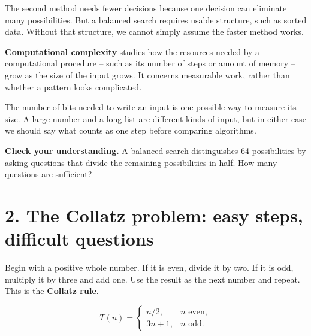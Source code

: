 \documentclass[11pt,letterpaper]{article}
\begin{document}
\par{}\par\medskip


The second method needs fewer decisions because one decision can eliminate many possibilities. But a balanced search requires usable structure, such as sorted data. Without that structure, we cannot simply assume the faster method works.


\textbf{Computational complexity} studies how the resources needed by a computational procedure -- such as its number of steps or amount of memory -- grow as the size of the input grows. It concerns measurable work, rather than whether a pattern looks complicated.

The number of bits needed to write an input is one possible way to measure its size. A large number and a long list are different kinds of input, but in either case we should say what counts as one step before comparing algorithms.



\begin{tcolorbox}[title={Pause and try 1},breakable]
\textbf{Check your understanding.} A balanced search distinguishes 64 possibilities by asking questions that divide the remaining possibilities in half. How many questions are sufficient?
\end{tcolorbox}




\section{2. The Collatz problem: easy steps, difficult questions}


Begin with a positive whole number. If it is even, divide it by two. If it is odd, multiply it by three and add one. Use the result as the next number and repeat. This is the \textbf{Collatz rule}.


\[
T(n)=\begin{cases} n/2,&n\text{ even},\\3n+1,&n\text{ odd}.\end{cases}
\]
\end{document}
